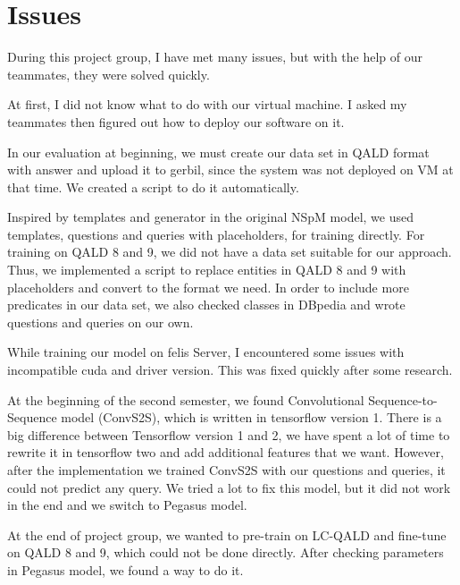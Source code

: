 
\section{Issues}

During this project group,
I have met many issues, 
but with the help of our teammates, 
they were solved quickly.

At first, I did not know what to do with our virtual machine. 
I asked my teammates then figured out how to deploy our software on it. 

In our evaluation at beginning, 
we must create our data set in QALD format with answer
and upload it to gerbil,
since the system was not deployed on VM at that time. 
We created a script to do it automatically. 

Inspired by templates and generator in the original NSpM model,
we used templates, questions and queries with placeholders, for training directly.
For training on QALD 8 and 9, 
we did not have a data set suitable for our approach. 
Thus, we implemented a script to replace entities in QALD 8 and 9 with placeholders
and convert to the format we need. 
In order to include more predicates in our data set, 
we also checked classes in DBpedia 
and wrote questions and queries on our own. 

While training our model on felis Server, 
I encountered some issues with incompatible cuda and driver version. 
This was fixed quickly after some research. 

At the beginning of the second semester,
we found Convolutional Sequence-to-Sequence model (ConvS2S),
which is written in tensorflow version 1. 
There is a big difference between Tensorflow version 1 and 2,
we have spent a lot of time to rewrite it in tensorflow two
and add additional features that we want.
However, after the implementation we trained ConvS2S with our questions and queries,
it could not predict any query. 
We tried a lot to fix this model, 
but it did not work in the end
and we switch to Pegasus model. 

At the end of project group, 
we wanted to pre-train on LC-QALD and fine-tune on QALD 8 and 9,
which could not be done directly. 
After checking parameters in Pegasus model, 
we found a way to do it. 